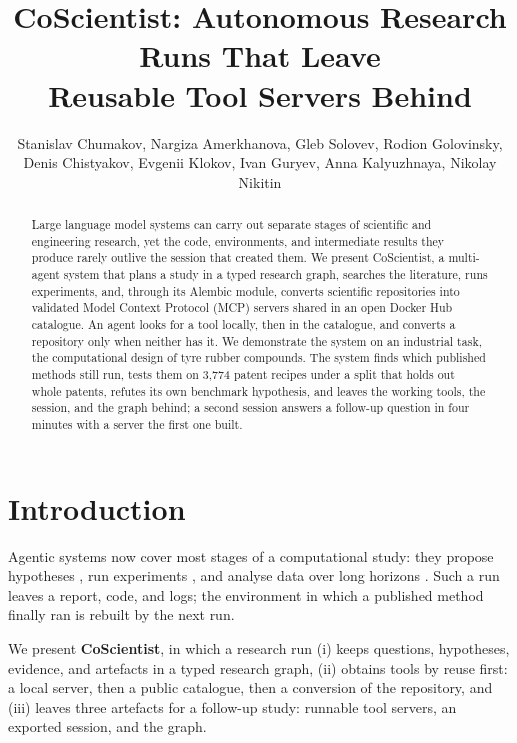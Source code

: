 \documentclass[letterpaper]{article} %
\title{CoScientist: Autonomous Research Runs That Leave\\Reusable Tool Servers Behind}
\author{
    Stanislav Chumakov,
    Nargiza Amerkhanova,
    Gleb Solovev,
    Rodion Golovinsky,
    Denis Chistyakov,
    Evgenii Klokov,
    Ivan Guryev,
    Anna Kalyuzhnaya,
    Nikolay Nikitin
}
\begin{document}
\maketitle

\begin{abstract}
Large language model systems can carry out separate stages of scientific and
engineering research, yet the code, environments, and intermediate results they
produce rarely outlive the session that created them. We present CoScientist, a
multi-agent system that plans a study in a typed research graph, searches the
literature, runs experiments, and, through its Alembic module, converts
scientific repositories into validated Model Context Protocol (MCP) servers
shared in an open Docker Hub catalogue. An agent looks for a tool locally, then
in the catalogue, and converts a repository only when neither has it. We
demonstrate the system on an industrial task, the computational design of tyre
rubber compounds. The system finds which published methods still run, tests them on 3,774
patent recipes under a split that holds out whole patents, refutes its own
benchmark hypothesis, and leaves the working tools, the session, and the graph
behind; a second session answers a follow-up question in four minutes with a
server the first one built.
\end{abstract}

\begin{links}
\end{links}

\section{Introduction}

Agentic systems now cover most stages of a computational study: they propose
hypotheses \citep{gottweis2026coscientist}, run experiments
\citep{lu2026aiscientist}, and analyse data over long horizons
\citep{mitchener2025kosmos}. Such a run leaves a report, code, and logs; the environment in which a
published method finally ran is rebuilt by the next run.

We present \textbf{CoScientist}, in which a research run (i) keeps questions,
hypotheses, evidence, and artefacts in a typed research graph, (ii) obtains
tools by reuse first: a local server, then a public catalogue, then a
conversion of the repository, and (iii) leaves three artefacts for a follow-up
study: runnable tool servers, an exported session, and the graph.
\end{document}
